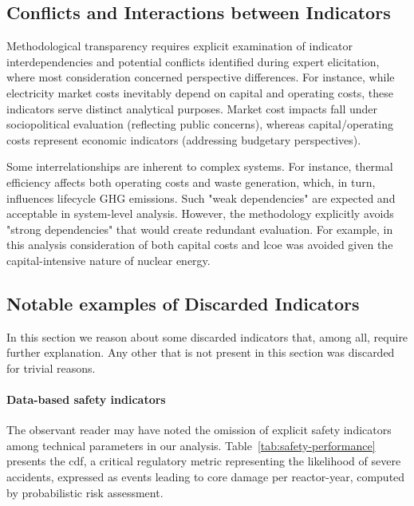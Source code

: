 \subsection{Conflicts and Interactions between Indicators}
\label{sec:indicators_conflicts}
Methodological transparency requires explicit examination of indicator interdependencies and potential conflicts identified during expert elicitation, where most consideration concerned perspective differences. For instance, while electricity market costs inevitably depend on capital and operating costs, these indicators serve distinct analytical purposes. Market cost impacts fall under sociopolitical evaluation (reflecting public concerns), whereas capital/operating costs represent economic indicators (addressing budgetary perspectives).

Some interrelationships are inherent to complex systems. For instance, thermal efficiency affects both operating costs and waste generation, which, in turn, influences lifecycle GHG emissions. Such "weak dependencies" are expected and acceptable in system-level analysis. However, the methodology explicitly avoids "strong dependencies" that would create redundant evaluation. For example, in this analysis consideration of both capital costs and \gls{lcoe} was avoided given the capital-intensive nature of nuclear energy.

\subsection{Notable examples of Discarded Indicators}
\label{sec:indicators_removed}
In this section we reason about some discarded indicators that, among all, require further explanation. Any other that is not present in this section was discarded for trivial reasons.

\paragraph{Data-based safety indicators}
The observant reader may have noted the omission of explicit safety indicators among technical parameters in our analysis. Table~\ref{tab:safety-performance} presents the \gls{cdf}, a critical regulatory metric representing the likelihood of severe accidents, expressed as events leading to core damage per reactor-year, computed by probabilistic risk assessment.

